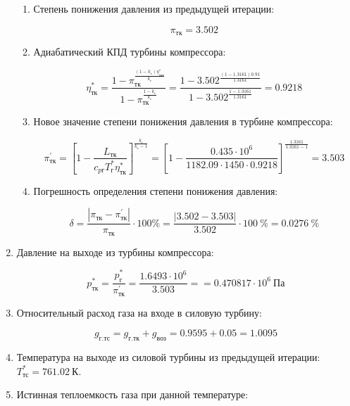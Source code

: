 \documentclass[a4paper,10pt]{article}
\begin{document}
\begin{enumerate}
	\begin{enumerate}
		
		\item Степень понижения давления из предыдущей итерации:
		
		\[
		\pi_{тк} = 3.502
		\]
		
		\item Адиабатический КПД турбины компрессора:
		
		\[
		\eta_{тк}^* = \frac{1 - \pi_{тк} ^ 
	                   {\frac{\left(1 - k_г \right) \eta_{ткп}^*}{k_г}}
					}{
					   1 - \pi_{тк} ^ {\frac{1 - k_г}{k_г}} 
					} = 
				\frac{1 - 3.502 ^ 
	                   {\frac{\left(1 - 1.3161 \right) 0.91 }{ 1.3161 }}
					}{
					   1 - 3.502 ^ {\frac{ 1 - 1.3161 }{ 1.3161 }} 
					} = 
			0.9218
		\]	
		
		\item Новое значение степени понижения давления в турбине компрессора:
		
		\[
		\pi_{тк}^\prime = \left[ 
							1 - \frac{L_{тк}}{c_{pг} T_г^* \eta_{тк}^*}	
						\right] ^ 
							\frac{k_г}{k_г - 1} =
					\left[ 
						1 - \frac{ 
								0.435 \cdot 10^6  
							}{ 
								1182.09 \cdot 1450 \cdot 0.9218
							}	
					\right] ^ 
						\frac{ 1.3161 }{ 1.3161 - 1} =
					3.503
		\]
		
		\item Погрешность определения степени понижения давления:
		
		\[
		\delta = \frac{ \left| \pi_{тк} - \pi_{тк}^\prime \right| }{ \pi_{тк} } \cdot 100 \% =
				\frac{ 
					\left| 3.502 - 3.503 \right|
				}{ 
					3.502 
				} \cdot 100\ \% = 
				0.0276\ \% 
		\]
	
	\end{enumerate}
	
	\item Давление на выходе из турбины компрессора:
	
	\[
	p_{тк}^* = \frac{ p_г^* }{ \pi_{тк}^\prime } = \frac{ 1.6493 \cdot 10^6 }{ 3.503 } = 
		= 0.470817 \cdot 10^6\ Па
	\]
	
	\item Относительный расход газа на входе в силовую турбину:
	
	\[ g_{г.тс} = g_{г.тк} + g_{воз} = 0.9595 + 0.05 = 1.0095 \]
	
	\item Температура на выходе из силовой турбины из предыдущей итерации: $ T_{тс}^* = 761.02\ К$.

	\item Истинная теплоемкость газа при данной температуре:
	

\end{enumerate}
\end{document}
